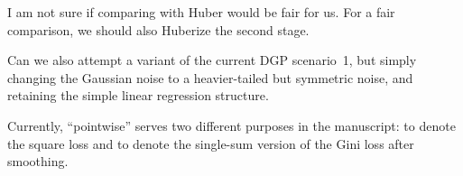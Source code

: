 \documentclass[11pt]{article}
\theoremstyle{plain}
\theoremstyle{plain}
\theoremstyle{plain}
\theoremstyle{plain}
\theoremstyle{plain}
\theoremstyle{plain}
\theoremstyle{plain}
\begin{document}
I am not sure if comparing with Huber would be fair for us.  For a fair comparison, we should also Huberize the second stage.

Can we also attempt a variant of the current DGP scenario~1, but simply changing the Gaussian noise to a heavier-tailed but symmetric noise, and retaining the simple linear regression structure.

Currently, ``pointwise'' serves two different purposes in the manuscript: to denote the square loss and to denote the single-sum version of the Gini loss after smoothing.



\end{document}
